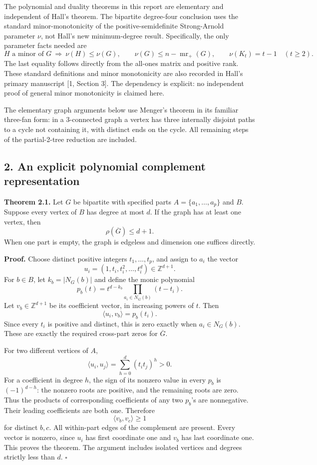 \documentclass[
  10pt,
]{article}
\begin{document}
The polynomial and duality theorems in this report are elementary and
independent of Hall's theorem. The bipartite degree-four conclusion uses
the standard minor-monotonicity of the positive-semidefinite
Strong-Arnold parameter \(\nu\), not Hall's new minimum-degree result.
Specifically, the only parameter facts needed are \[
 H\text{ a minor of }G\ \Longrightarrow\ \nu(H)\le\nu(G),\qquad
 \nu(G)\le n-\operatorname{mr}_+(G),\qquad \nu(K_t)=t-1\quad(t\ge2).
\] The last equality follows directly from the all-ones matrix and
positive rank. These standard definitions and minor monotonicity are
also recorded in Hall's primary manuscript {[}1, Section 3{]}. The
dependency is explicit: no independent proof of general minor
monotonicity is claimed here.

The elementary graph arguments below use Menger's theorem in its
familiar three-fan form: in a 3-connected graph a vertex has three
internally disjoint paths to a cycle not containing it, with distinct
ends on the cycle. All remaining steps of the partial-2-tree reduction
are included.

\subsection{2. An explicit polynomial complement
representation}\label{an-explicit-polynomial-complement-representation}

\textbf{Theorem 2.1.} Let \(G\) be bipartite with specified parts
\(A=\{a_1,\ldots,a_p\}\) and \(B\). Suppose every vertex of \(B\) has
degree at most \(d\). If the graph has at least one vertex, then \[
 \boxed{\rho(\overline G)\le d+1.}
\] When one part is empty, the graph is edgeless and dimension one
suffices directly.

\textbf{Proof.} Choose distinct positive integers \(t_1,\ldots,t_p\),
and assign to \(a_i\) the vector \[
 u_i=(1,t_i,t_i^2,\ldots,t_i^d)\in\mathbb Z^{d+1}.
\] For \(b\in B\), let \(k_b=|N_G(b)|\) and define the monic polynomial
\[
 p_b(t)=t^{d-k_b}\prod_{a_i\in N_G(b)}(t-t_i).
\] Let \(v_b\in\mathbb Z^{d+1}\) be its coefficient vector, in
increasing powers of \(t\). Then \[
 \langle u_i,v_b\rangle=p_b(t_i).
\] Since every \(t_i\) is positive and distinct, this is zero exactly
when \(a_i\in N_G(b)\). These are exactly the required cross-part zeros
for \(\overline G\).

For two different vertices of \(A\), \[
 \langle u_i,u_j\rangle=\sum_{h=0}^d(t_i t_j)^h>0.
\] For a coefficient in degree \(h\), the sign of its nonzero value in
every \(p_b\) is \((-1)^{d-h}\): the nonzero roots are positive, and the
remaining roots are zero. Thus the products of corresponding
coefficients of any two \(p_b\)'s are nonnegative. Their leading
coefficients are both one. Therefore \[
 \langle v_b,v_c\rangle\ge1
\] for distinct \(b,c\). All within-part edges of the complement are
present. Every vector is nonzero, since \(u_i\) has first coordinate one
and \(v_b\) has last coordinate one. This proves the theorem. The
argument includes isolated vertices and degrees strictly less than
\(d\). \(\square\)
\end{document}
